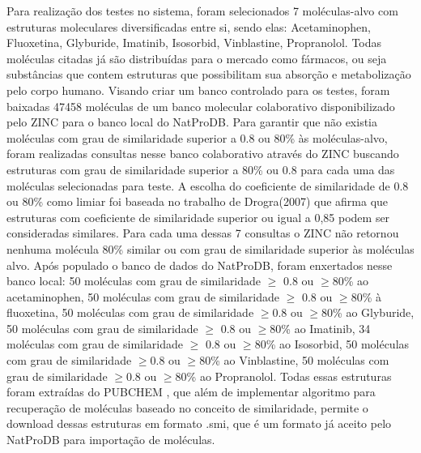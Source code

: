 Para realização dos testes no sistema, foram selecionados 7 moléculas-alvo  com estruturas moleculares diversificadas entre si, sendo elas: Acetaminophen, Fluoxetina, Glyburide, Imatinib, Isosorbid, Vinblastine, Propranolol. Todas moléculas citadas já são distribuídas para o mercado como fármacos, ou seja substâncias que contem estruturas que possibilitam sua absorção e metabolização pelo corpo humano. Visando criar um banco controlado para os testes, foram baixadas 47458 moléculas de um banco molecular colaborativo disponibilizado pelo ZINC \cite{irwin2005zinc} para o banco local do NatProDB. Para garantir que não existia moléculas com grau de similaridade superior a 0.8 ou 80\% às moléculas-alvo, foram realizadas consultas nesse banco colaborativo através do ZINC buscando estruturas com grau de similaridade superior a 80\% ou 0.8 para cada uma das moléculas selecionadas para teste. A escolha do coeficiente de similaridade de 0.8 ou 80\% como limiar foi baseada no trabalho de Drogra(2007) que afirma que estruturas com coeficiente de similaridade superior ou igual a 0,85 podem ser consideradas similares. Para cada uma dessas 7 consultas o ZINC não retornou nenhuma molécula 80\% similar ou com grau de similaridade superior às moléculas alvo. Após populado o banco de dados do NatProDB, foram enxertados nesse banco local: 50 moléculas com grau de similaridade $\geq $ 0.8 ou $\geq $80\% ao acetaminophen, 50 moléculas com grau de similaridade $\geq $ 0.8 ou $\geq $80\% à fluoxetina, 50 moléculas com grau de similaridade $\geq $0.8 ou $\geq $80\% ao Glyburide, 50 moléculas com grau de similaridade $\geq $ 0.8 ou $\geq $80\% ao Imatinib, 34 moléculas com grau de similaridade $\geq $ 0.8 ou $\geq $80\% ao Isosorbid, 50 moléculas com grau de similaridade $\geq $0.8 ou $\geq $80\% ao Vinblastine, 50 moléculas com grau de similaridade $\geq $0.8 ou $\geq $80\% ao Propranolol. Todas essas estruturas foram extraídas do PUBCHEM \cite{li2010pubchem}, que além de implementar algoritmo para recuperação de moléculas baseado no conceito de similaridade, permite o download dessas estruturas em formato .smi, que é um formato já aceito pelo NatProDB para importação de moléculas.

